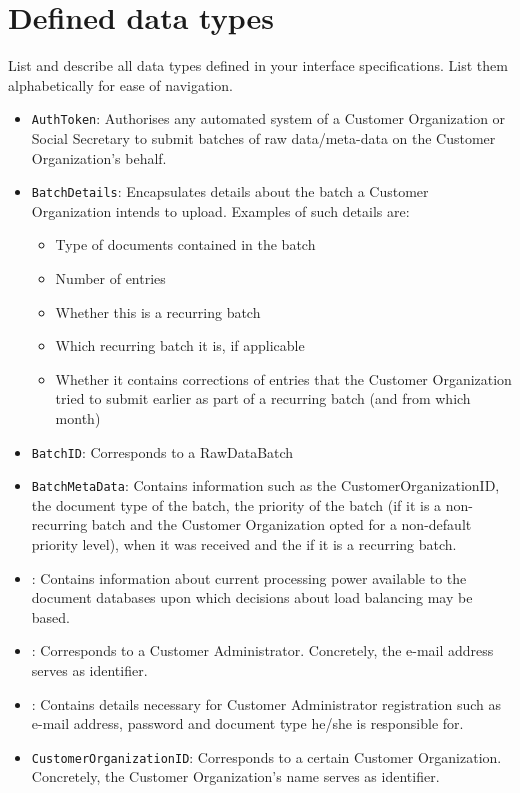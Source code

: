 \section{Defined data types}\label{app:datatypes}
List and describe all data types defined in your interface specifications. List
them alphabetically for ease of navigation.

\begin{itemize}
	\item \texttt{AuthToken}: Authorises any automated system of a Customer Organization or Social Secretary to submit batches of raw data/meta-data on the Customer Organization's behalf.
	\item \texttt{BatchDetails}: Encapsulates details about the batch a Customer Organization intends to upload. Examples of such details are:
	\begin{itemize}
		\item Type of documents contained in the batch
		\item Number of entries
		\item Whether this is a recurring batch
		\item Which recurring batch it is, if applicable
		\item Whether it contains corrections of entries that the Customer Organization tried to submit earlier as part of a recurring batch (and from which month)
	\end{itemize}
	\item \texttt{BatchID}: Corresponds to a RawDataBatch
	\item \texttt{BatchMetaData}: Contains information such as the CustomerOrganizationID, the document type of the batch, the priority of the batch (if it is a non-recurring batch and the Customer Organization opted for a non-default priority level), when it was received and the  if it is a recurring batch.
	\item {}: Contains information about current processing power available to the document databases upon which decisions about load balancing may be based.
	\item {}: Corresponds to a Customer Administrator. Concretely, the e-mail address serves as identifier.
	\item {}: Contains details necessary for Customer Administrator registration such as e-mail address, password and document type he/she is responsible for.
	\item \texttt{CustomerOrganizationID}: Corresponds to a certain Customer Organization. Concretely, the Customer Organization's name serves as identifier.

\end{itemize}
